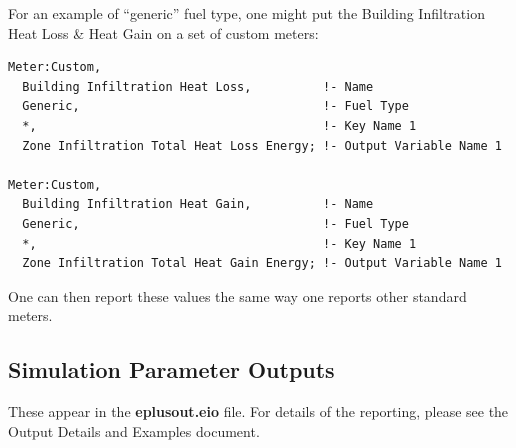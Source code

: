 For an example of ``generic'' fuel type, one might put the Building Infiltration Heat Loss \& Heat Gain on a set of custom meters:

\begin{lstlisting}
Meter:Custom,
  Building Infiltration Heat Loss,          !- Name
  Generic,                                  !- Fuel Type
  *,                                        !- Key Name 1
  Zone Infiltration Total Heat Loss Energy; !- Output Variable Name 1

Meter:Custom,
  Building Infiltration Heat Gain,          !- Name
  Generic,                                  !- Fuel Type
  *,                                        !- Key Name 1
  Zone Infiltration Total Heat Gain Energy; !- Output Variable Name 1
\end{lstlisting}

One can then report these values the same way one reports other standard meters.

\subsection{Simulation Parameter Outputs}\label{simulation-parameter-outputs}

These appear in the \textbf{eplusout.eio} file. For details of the reporting, please see the Output Details and Examples document.
